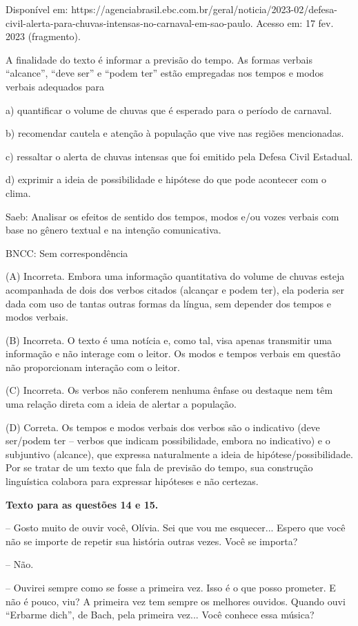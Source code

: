 Disponível em:
https://agenciabrasil.ebc.com.br/geral/noticia/2023-02/defesa-civil-alerta-para-chuvas-intensas-no-carnaval-em-sao-paulo.
Acesso em: 17 fev. 2023 (fragmento).

A finalidade do texto é informar a previsão do tempo. As formas verbais
``alcance'', ``deve ser'' e ``podem ter'' estão empregadas nos tempos e
modos verbais adequados para

a) quantificar o volume de chuvas que é esperado para o período de
carnaval.

b) recomendar cautela e atenção à população que vive nas regiões
mencionadas.

c) ressaltar o alerta de chuvas intensas que foi emitido pela Defesa
Civil Estadual.

d) exprimir a ideia de possibilidade e hipótese do que pode acontecer
com o clima.

Saeb: Analisar os efeitos de sentido dos tempos, modos e/ou vozes
verbais com base no gênero textual e na intenção comunicativa.

BNCC: Sem correspondência

(A) Incorreta. Embora uma informação quantitativa do volume de chuvas
esteja acompanhada de dois dos verbos citados (alcançar e podem ter),
ela poderia ser dada com uso de tantas outras formas da língua, sem
depender dos tempos e modos verbais.

(B) Incorreta. O texto é uma notícia e, como tal, visa apenas transmitir
uma informação e não interage com o leitor. Os modos e tempos verbais em
questão não proporcionam interação com o leitor.

(C) Incorreta. Os verbos não conferem nenhuma ênfase ou destaque nem têm
uma relação direta com a ideia de alertar a população.

(D) Correta. Os tempos e modos verbais dos verbos são o indicativo (deve
ser/podem ter -- verbos que indicam possibilidade, embora no indicativo)
e o subjuntivo (alcance), que expressa naturalmente a ideia de
hipótese/possibilidade. Por se tratar de um texto que fala de previsão
do tempo, sua construção linguística colabora para expressar hipóteses e
não certezas.

\textbf{Texto para as questões 14 e 15.}

-- Gosto muito de ouvir você, Olívia. Sei que vou me esquecer... Espero
que você não se importe de repetir sua história outras vezes. Você se
importa?

-- Não.

-- Ouvirei sempre como se fosse a primeira vez. Isso é o que posso
prometer. E não é pouco, viu? A primeira vez tem sempre os melhores
ouvidos. Quando ouvi ``Erbarme dich'', de Bach, pela primeira vez...
Você conhece essa música?

